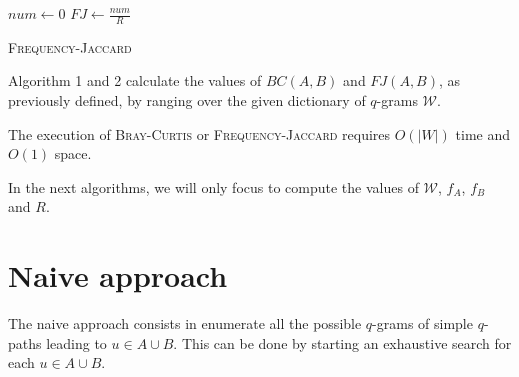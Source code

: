 \begin{algorithm}[h]
	\small
	\DontPrintSemicolon
	\BlankLine
	$num \gets 0$\;
	$FJ \gets \frac{num}{R}$\;
	\caption{\textsc{Frequency-Jaccard}}
	\label{alg:jaccard}
\end{algorithm}

Algorithm 1 and 2 calculate the values of $BC(A,B)$ and $FJ(A,B)$, as previously defined, by ranging over the given dictionary of $q$-grams $\mathcal{W}$.

\begin{lemma}
	The execution of \textsc{Bray-Curtis} or \textsc{Frequency-Jaccard} requires $O(|W|)$ time and $O(1)$ space. 	
\end{lemma}

In the next algorithms, we will only focus to compute the values of $\mathcal{W}$, $f_{A}$, $f_{B}$ and $R$.

\clearpage 

\section{Naive approach}

The naive approach consists in enumerate all the possible $q$-grams of simple $q$-paths leading to $u \in A \cup B$. This can be done by starting an exhaustive search for each $u \in A \cup B$.
	
